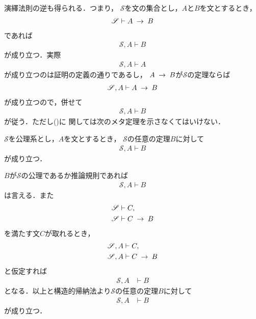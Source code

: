 	演繹法則の逆も得られる．つまり，
	$\mathscr{S}$を文の集合とし，$A$と$B$を文とするとき，
	\begin{align}
		\mathscr{S} \vdash A \hspace{0.25em}\rightarrow\hspace{0.25em} B
	\end{align}
	であれば
	\begin{align}
		\mathscr{S}, A \vdash B
	\end{align}
	が成り立つ．実際
	\begin{align}
		\mathscr{S}, A \vdash A
	\end{align}
	が成り立つのは証明の定義の通りであるし，
	$A \hspace{0.25em}\rightarrow\hspace{0.25em} B$が$\mathscr{S}$の定理ならば
	\begin{align}
		\mathscr{S}, A \vdash A \hspace{0.25em}\rightarrow\hspace{0.25em} B
		\label{fom:inversion_of_deduction_theorem}
	\end{align}
	が成り立つので，併せて
	\begin{align}
		\mathscr{S}, A \vdash B
	\end{align}
	が従う．ただし()に
	関しては次のメタ定理を示さなくてはいけない．
	
	\begin{screen}
		\begin{metathm}[公理が増えても証明可能]
			$\mathscr{S}$を公理系とし，$A$を文とするとき，
			$\mathscr{S}$の任意の定理$B$に対して
			\begin{align}
				\mathscr{S}, A \vdash B
			\end{align}
			が成り立つ．
		\end{metathm}
	\end{screen}
	
	\begin{metaprf}
		$B$が$\mathscr{S}$の公理であるか推論規則であれば
		\begin{align}
			\mathscr{S}, A \vdash B
		\end{align}
		は言える．また
		\begin{align}
			\mathscr{S} &\vdash C, \\
			\mathscr{S} &\vdash C \hspace{0.25em}\rightarrow\hspace{0.25em} B
		\end{align}
		を満たす文$C$が取れるとき，
		\begin{align}
			\mathscr{S}, A &\vdash C, \\
			\mathscr{S}, A &\vdash C \hspace{0.25em}\rightarrow\hspace{0.25em} B
		\end{align}
		と仮定すれば
		\begin{align}
			\mathscr{S}, A &\vdash B
		\end{align}
		となる．以上と構造的帰納法より$\mathscr{S}$の任意の定理$B$に対して
		\begin{align}
			\mathscr{S}, A &\vdash B
		\end{align}
		が成り立つ．
		\QED
	\end{metaprf}
	
